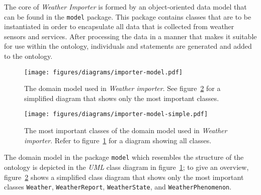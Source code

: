 The core of \emph{Weather Importer} is formed by an object-oriented data model that can be found in the \texttt{model} package. This package contains classes that are to be instantiated in order to encapsulate all data that is collected from weather sensors and services. After processing the data in a manner that makes it suitable for use within the \smarthomeweather ontology, individuals and statements are generated and added to the ontology.

\begin{figure}
\centering
\texttt{[image: figures/diagrams/importer-model.pdf]}
\caption{The domain model used in \emph{Weather importer}. See figure~\ref{fig:importer_model2} for a simplified diagram that shows only the most important classes.}
\label{fig:importer_model1}
\end{figure}

\begin{figure}
\centering
\texttt{[image: figures/diagrams/importer-model-simple.pdf]}
\caption{The most important classes of the domain model used in \emph{Weather importer}. Refer to figure~\ref{fig:importer_model1} for a diagram showing all classes.}
\label{fig:importer_model2}
\end{figure}

The domain model in the package \texttt{model} which resembles the structure of the \smarthomeweather ontology is depicted in the \emph{UML} class diagram in figure~\ref{fig:importer_model1}; to give an overview, figure~\ref{fig:importer_model2} shows a simplified class diagram that shows only the most important classes \texttt{Weather}, \texttt{WeatherReport}, \texttt{WeatherState}, and \texttt{WeatherPhenomenon}.

